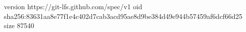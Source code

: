 version https://git-lfs.github.com/spec/v1
oid sha256:83631aa8e77f1e4c402d7cab3acd95ae8d9be384d49e944b57459af6dcf66d25
size 87540
